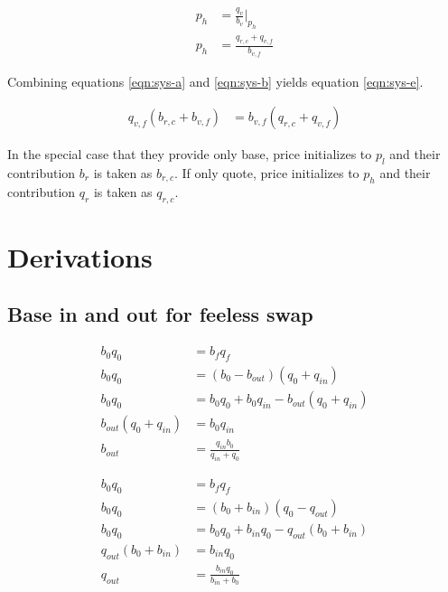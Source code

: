 \documentclass[table, twocolumn]{article}
\begin{document}
\begin{align} \label{eqn:sys-d}
  p_h & = \frac{q_v}{b_v}|_{p_h} \nonumber     \\
  p_h & = \frac{q_{r, c} + q_{v, f}}{b_{v, f}}
\end{align}

Combining equations \ref{eqn:sys-a} and \ref{eqn:sys-b} yields equation \ref{eqn:sys-e}.

\begin{align} \label{eqn:sys-e}
  q_{v, f} (b_{r, c} + b_{v, f}) & = b_{v, f} (q_{r, c} + q_{v, f})
\end{align}

In the special case that they provide only base, price initializes to $p_l$ and their
contribution $b_r$ is taken as $b_{r, c}$. If only quote, price initializes to $p_h$ and
their contribution $q_r$ is taken as $q_{r, c}$.

\section{Derivations}

\subsection{Base in and out for feeless swap} \label{eqn:b-q-out-simple-derivation}

\begin{align}
  b_0 q_0               & = b_f q_f \nonumber                                      \\
  b_0 q_0               & = (b_0 - b_{out})(q_0 + q_{in}) \nonumber                \\
  b_0 q_0               & = b_0 q_0 + b_0 q_{in} - b_{out}(q_0 + q_{in}) \nonumber \\
  b_{out}(q_0 + q_{in}) & = b_{0} q_{in} \nonumber                                 \\
  b_{out}               & = \frac{q_{in} b_0}{q_{in} + q_0}
\end{align}

\begin{align}
  b_0 q_0               & = b_f q_f \nonumber                                      \\
  b_0 q_0               & = (b_0 + b_{in})(q_0 - q_{out}) \nonumber                \\
  b_0 q_0               & = b_0 q_0 + b_{in} q_0 - q_{out}(b_0 + b_{in}) \nonumber \\
  q_{out}(b_0 + b_{in}) & = b_{in} q_0 \nonumber                                   \\
  q_{out}               & = \frac{b_{in} q_0}{b_{in} + b_0}
\end{align}
\end{document}
